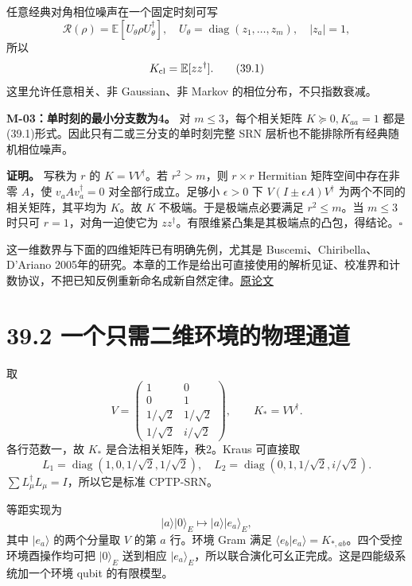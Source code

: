 \documentclass[
  11pt,
  oneside]{book}
\begin{document}
任意经典对角相位噪声在一个固定时刻可写 \[
\mathcal R(\rho)=\mathbb E[U_\theta\rho U_\theta^\dagger],
\quad U_\theta=\operatorname{diag}(z_1,\ldots,z_m),\quad |z_a|=1,
\] 所以 \[
K_{\rm cl}=\mathbb E[zz^\dagger].
\tag{39.1}
\] 这里允许任意相关、非 Gaussian、非 Markov 的相位分布，不只指数衰减。

\protect\hypertarget{m-03}{}{}

\textbf{M-03：单时刻的最小分支数为4。} 对 \(m\le3\)，每个相关矩阵
\(K\succeq0,K_{aa}=1\) 都是(39.1)形式。因此只有二或三分支的单时刻完整
SRN 层析也不能排除所有经典随机相位噪声。

\textbf{证明。} 写秩为 \(r\) 的 \(K=VV^\dagger\)。若 \(r^2>m\)，则
\(r\times r\) Hermitian 矩阵空间中存在非零 \(A\)，使
\(v_aAv_a^\dagger=0\) 对全部行成立。足够小 \(\epsilon>0\) 下
\(V(I\pm\epsilon A)V^\dagger\) 为两个不同的相关矩阵，其平均为 \(K\)。故
\(K\) 不极端。于是极端点必要满足 \(r^2\le m\)。当 \(m\le3\) 时只可
\(r=1\)，对角一迫使它为
\(zz^\dagger\)。有限维紧凸集是其极端点的凸包，得结论。\(\square\)

这一维数界与下面的四维矩阵已有明确先例，尤其是
Buscemi、Chiribella、D'Ariano
2005年的研究。本章的工作是给出可直接使用的解析见证、校准界和计数协议，不把已知反例重新命名成新自然定律。\href{https://doi.org/10.1103/PhysRevLett.95.090501}{原论文}

\hypertarget{ux4e00ux4e2aux53eaux9700ux4e8cux7ef4ux73afux5883ux7684ux7269ux7406ux901aux9053}{%
\section{39.2
一个只需二维环境的物理通道}\label{ux4e00ux4e2aux53eaux9700ux4e8cux7ef4ux73afux5883ux7684ux7269ux7406ux901aux9053}}

取 \[
V=\begin{pmatrix}
1&0\\0&1\\1/\sqrt2&1/\sqrt2\\1/\sqrt2&i/\sqrt2
\end{pmatrix},\qquad K_*=VV^\dagger.
\tag{39.2}
\] 各行范数一，故 \(K_*\) 是合法相关矩阵，秩2。Kraus 可直接取 \[
L_1=\operatorname{diag}(1,0,1/\sqrt2,1/\sqrt2),\quad
L_2=\operatorname{diag}(0,1,1/\sqrt2,i/\sqrt2).
\tag{39.3}
\] \(\sum L_\mu^\dagger L_\mu=I\)，所以它是标准 CPTP-SRN。

等距实现为 \[
|a\rangle|0\rangle_E\longmapsto |a\rangle|e_a\rangle_E,
\] 其中 \(|e_a\rangle\) 的两个分量取 \(V\) 的第 \(a\) 行。环境 Gram 满足
\(\langle e_b|e_a\rangle=K_{*,ab}\)。四个受控环境酉操作均可把
\(|0\rangle_E\) 送到相应
\(|e_a\rangle_E\)，所以联合演化可幺正完成。这是四能级系统加一个环境
qubit 的有限模型。
\end{document}
